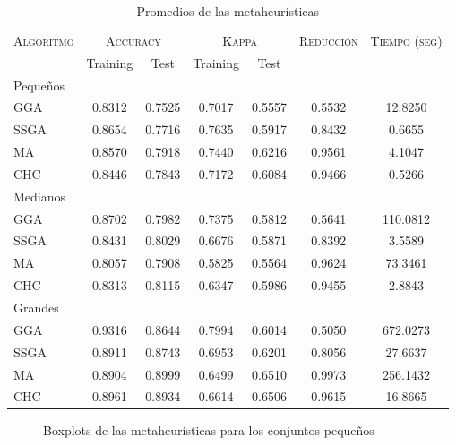 \begin{table}[h!]
\centering
\begin{tabular}{l c c c c c c}
\hline
\multirow{2}{*}{\textsc{Algoritmo}}
	& \multicolumn{2}{c}{\textsc{Accuracy}}
	& \multicolumn{2}{c}{\textsc{Kappa}}
	& \textsc{Reducción}
	& \textsc{Tiempo (seg)} \\
	& Training & Test
	& Training & Test \\ 
\hline
\hline

Pequeños\\
GGA  & 0.8312 & 0.7525 & 0.7017 & 0.5557 & 0.5532 & 12.8250 \\
SSGA & 0.8654 & 0.7716 & 0.7635 & 0.5917 & 0.8432 & 0.6655 \\
MA   & 0.8570 & 0.7918 & 0.7440 & 0.6216 & 0.9561 & 4.1047 \\
CHC & 0.8446 & 0.7843 & 0.7172 & 0.6084 & 0.9466 & 0.5266 \\

\hline

Medianos\\
GGA  & 0.8702 & 0.7982 & 0.7375 & 0.5812 & 0.5641 & 110.0812 \\
SSGA & 0.8431 & 0.8029 & 0.6676 & 0.5871 & 0.8392 & 3.5589 \\
MA   & 0.8057 & 0.7908 & 0.5825 & 0.5564 & 0.9624 & 73.3461 \\
CHC  & 0.8313 & 0.8115 & 0.6347 & 0.5986 & 0.9455 & 2.8843 \\

\hline
Grandes\\
GGA  & 0.9316 & 0.8644 & 0.7994 & 0.6014 & 0.5050 & 672.0273 \\
SSGA & 0.8911 & 0.8743 & 0.6953 & 0.6201 & 0.8056 & 27.6637 \\
MA   & 0.8904 & 0.8999 & 0.6499 & 0.6510 & 0.9973 & 256.1432 \\
CHC  & 0.8961 & 0.8934 & 0.6614 & 0.6506 & 0.9615 & 16.8665 \\

\hline
\end{tabular}
\caption{Promedios de las metaheurísticas}
\label{meta}
\end{table}


\begin{figure}[h!]

	\centering

\caption{Boxplots de las metaheurísticas para los conjuntos pequeños}
\label{small-heuristics}
\end{figure}

